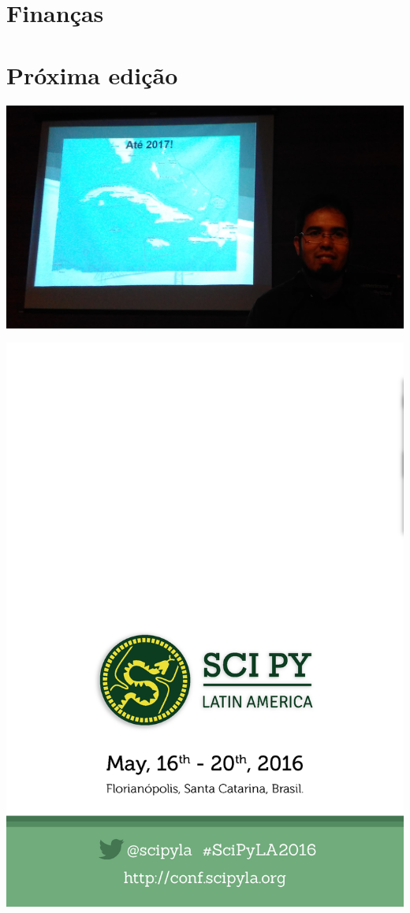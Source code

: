 \documentclass[12pt]{article}
\begin{document}
\newpage

\section*{Finanças}

\newpage

\section*{Próxima edição}

\noindent  %
\includegraphics[width=\textwidth]{2017.jpg}

\newpage

\thispagestyle{empty}
\noindent  %
\includegraphics{../../assets/contra-capa}
\NoBgThispage
\end{document}
